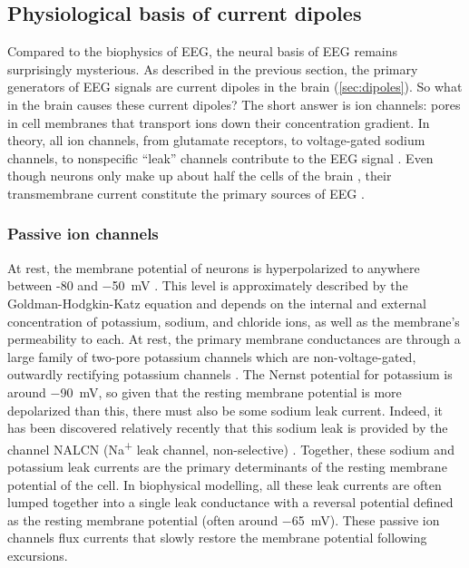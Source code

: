 \subsection{Physiological basis of current dipoles}
Compared to the biophysics of EEG, the neural basis of EEG remains surprisingly mysterious. As described in the previous section, the primary generators of EEG signals are current dipoles in the brain (\autoref{sec:dipoles}). So what in the brain causes these current dipoles? The short answer is ion channels: pores in cell membranes that transport ions down their concentration gradient. In theory, all ion channels, from glutamate receptors, to voltage-gated sodium channels, to nonspecific ``leak'' channels contribute to the EEG signal \cite{Buzsaki2012}. Even though neurons only make up about half the cells of the brain \cite{Azevedo2009}, their transmembrane current constitute the primary sources of EEG \cite{Buzsaki2012}.

\subsubsection{Passive ion channels}
At rest, the membrane potential of neurons is hyperpolarized to anywhere between -80 and \qty{-50}{\milli\volt} \cite{Ren2011}. This level is approximately described by the Goldman-Hodgkin-Katz equation \cite{Hodgkin1949} and depends on the internal and external concentration of potassium, sodium, and chloride ions, as well as the membrane's permeability to each. At rest, the primary membrane conductances are through a large family of two-pore potassium channels \cite{Goldstein2005,Ren2011} which are non-voltage-gated, outwardly rectifying potassium channels \cite{Goldstein2001}. The Nernst potential for potassium is around \qty{-90}{\milli\volt}, so given that the resting membrane potential is more depolarized than this, there must also be some sodium leak current. Indeed, it has been discovered relatively recently that this sodium leak is provided by the channel NALCN (Na\textsuperscript{+} leak channel, non-selective) \cite{Ren2011}. Together, these sodium and potassium leak currents are the primary determinants of the resting membrane potential of the cell. In biophysical modelling, all these leak currents are often lumped together into a single leak conductance with a reversal potential defined as the resting membrane potential (often around \qty{-65}{\milli\volt}). These passive ion channels flux currents that slowly restore the membrane potential following excursions.

